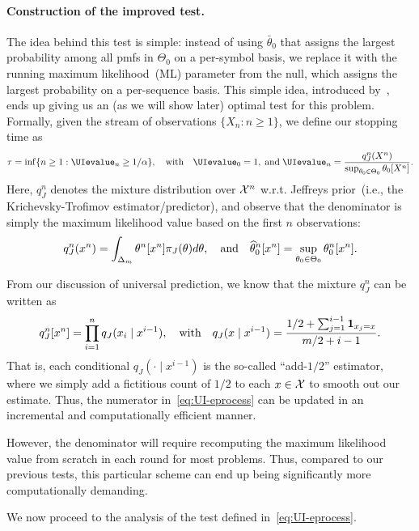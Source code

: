 \documentclass[12pt]{article}
\begin{document}
\paragraph{Construction of the improved test.} The idea behind this test is simple: instead of using $\bar{\theta}_0$ that assigns the largest probability among all pmfs in $\Theta_0$ on a per-symbol basis, we replace it with the running maximum likelihood~(ML) parameter from the null, which assigns the largest probability on a  per-sequence basis. This simple idea, introduced by~\citet[Section 8]{wasserman2020universal}, ends up giving us an (as we will show later)  optimal test for this problem. Formally, given the stream of observations $\{X_n: n \geq 1\}$, we define our stopping time as 
\begin{align}
    \tau = \inf \{n \geq 1: \UIevalue_n \geq 1/\alpha\}, \qtext{with} \UIevalue_0 = 1, \; \text{and}\; \UIevalue_n = \frac{q_J^n(X^n)}{\sup_{\theta_0 \in \Theta_0} \theta_0[X^n] }.  \label{eq:UI-eprocess}
\end{align}
Here, $q_J^n$ denotes the mixture distribution over ${\cal X}^n$ w.r.t. Jeffreys prior~(i.e., the Krichevsky-Trofimov estimator/predictor), and observe that the denominator is simply the maximum likelihood value based on the first $n$ observations: 
\begin{align}
q_J^n(x^n) = \int_{\Delta_m} \theta^n[x^n] \pi_J(\theta) d\theta, \quad \text{and} \quad \widehat{\theta}_{0}^n[x^n] = \sup_{\theta_0 \in \Theta_0}  \theta_0^n[x^n].  
\end{align}
\begin{remark}
    From our discussion of universal prediction, we know that the mixture $q_J^n$ can be written as 
    \begin{align}
        q_J^n[x^n] =  \prod_{i=1}^n q_{J}(x_i \mid x^{i-1}), \quad \text{with} \quad q_J(x \mid x^{i-1}) = \frac{ 1/2 + \sum_{j=1}^{i-1} \boldsymbol{1}_{x_j=x} }{ m/2 + i-1}. 
    \end{align}
    That is, each conditional $q_J(\cdot \mid x^{i-1})$ is the so-called ``add-$1/2$'' estimator, where we simply add a fictitious count of $1/2$ to each $x \in {\cal X}$ to smooth out our estimate. Thus, the numerator in~\eqref{eq:UI-eprocess} can be updated in an incremental and computationally efficient manner. 

    However, the denominator will require recomputing the maximum likelihood value from scratch in each round for most problems. Thus, compared to our previous tests, this particular scheme can end up being significantly more computationally demanding. 
\end{remark}
We now proceed to the analysis of the test defined in~\eqref{eq:UI-eprocess}. 
\end{document}
